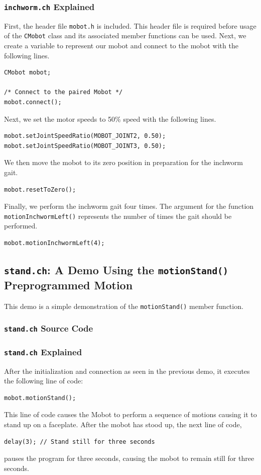 \documentclass{article}
\begin{document}
\subsubsection{\texttt{inchworm.ch} Explained}
First, the header file \texttt{mobot.h} is included. This header file
is required before usage of the \texttt{CMobot} class and its associated
member functions can be used. Next, we create a variable to represent our
mobot and connect to the mobot with the following lines.
\begin{verbatim}
CMobot mobot;

/* Connect to the paired Mobot */
mobot.connect();
\end{verbatim}

Next, we set the motor speeds to 50\% speed with the following lines.
\begin{verbatim}
mobot.setJointSpeedRatio(MOBOT_JOINT2, 0.50);
mobot.setJointSpeedRatio(MOBOT_JOINT3, 0.50);
\end{verbatim}

We then move the mobot to its zero position in preparation for the 
inchworm gait.
\begin{verbatim}
mobot.resetToZero();
\end{verbatim}

Finally, we perform the inchworm gait four times. The argument for the
function \texttt{motionInchwormLeft()} represents the number of times
the gait should be performed.
\begin{verbatim}
mobot.motionInchwormLeft(4);
\end{verbatim}


\subsection{\texttt{stand.ch}: A Demo Using the \texttt{motionStand()} Preprogrammed
Motion}
This demo is a simple demonstration of the \texttt{motionStand()} member function.
\subsubsection{\texttt{stand.ch} Source Code}

\subsubsection{\texttt{stand.ch} Explained}
After the initialization and 
connection as seen in the previous demo, it executes the following line of
code:
\begin{verbatim}
mobot.motionStand();
\end{verbatim}
This line of code causes the Mobot to perform a sequence of motions causing it to
stand up on a faceplate. After the mobot has stood up, the next line of code,
\begin{verbatim}
delay(3); // Stand still for three seconds
\end{verbatim}
pauses the program for three seconds, causing the mobot to remain still for three
seconds. 
\end{document}
